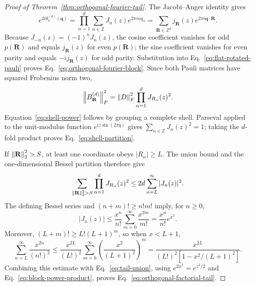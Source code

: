\begin{proof}[Proof of Theorem~\ref{thm:orthogonal-fourier-tail}]
The Jacobi--Anger identity gives
\begin{equation}
 e^{2i\theta_a^{(d)}(\mathbf q)}
 =\prod_{\alpha=1}^d
  \sum_{n\in\mathbb Z}J_n(z)e^{2\pi inq_\alpha}
 =\sum_{\mathbf R\in\mathbb Z^d}
  j_{\mathbf R}(z)e^{2\pi i\mathbf q\cdot\mathbf R}.
\end{equation}
Because $J_{-n}(z)=(-1)^nJ_n(z)$, the cosine coefficient vanishes for odd
$p(\mathbf R)$ and equals $j_{\mathbf R}(z)$ for even $p(\mathbf R)$; the sine
coefficient vanishes for even parity and equals $-ij_{\mathbf R}(z)$ for odd parity.
Substitution into Eq.~\eqref{eq:flat-rotated-pauli} proves
Eq.~\eqref{eq:orthogonal-fourier-block}. Since both Pauli matrices have squared
Frobenius norm two,
\begin{equation}
 \left\lVert B_{\mathbf R}^{(d)}\right\rVert_F^2
 =\left\lVert D\right\rVert_F^2\prod_{\alpha=1}^dJ_{R_\alpha}(z)^2.
 \label{eq:block-power-product}
\end{equation}
Equation~\eqref{eq:shell-power} follows by grouping a complete shell. Parseval applied
to the unit-modulus function $e^{iz\sin(2\pi q)}$ gives
$\sum_{n\in\mathbb Z}J_n(z)^2=1$; taking the $d$-fold product proves
Eq.~\eqref{eq:shell-partition}.

If $\left\lVert \mathbf R\right\rVert_2^2>S$, at least one coordinate obeys $|R_\alpha|\ge L$.
The union bound and the one-dimensional Bessel partition therefore give
\begin{equation}
 \sum_{\left\lVert \mathbf R\right\rVert_2^2>S}
 \prod_{\alpha=1}^dJ_{R_\alpha}(z)^2
 \le 2d\sum_{n=L}^{\infty}|J_n(z)|^2.
 \label{eq:tail-union}
\end{equation}
The defining Bessel series and $(n+m)!\ge n!m!$ imply, for $n\ge0$,
\begin{equation}
 |J_n(z)|
 \le \frac{x^n}{n!}\sum_{m=0}^{\infty}\frac{x^{2m}}{m!}
 =\frac{x^n}{n!}e^{x^2}.
\end{equation}
Moreover, $(L+m)!\ge L!(L+1)^m$, so when $x<L+1$,
\begin{equation}
 \sum_{n=L}^{\infty}\frac{x^{2n}}{(n!)^2}
 \le \frac{x^{2L}}{(L!)^2}
 \sum_{m=0}^{\infty}\left(\frac{x^2}{(L+1)^2}\right)^m
 =\frac{x^{2L}}
 {(L!)^2\left[1-x^2/(L+1)^2\right]}.
\end{equation}
Combining this estimate with Eq.~\eqref{eq:tail-union}, using
$e^{2x^2}=e^{z^2/2}$ and Eq.~\eqref{eq:block-power-product}, proves
Eq.~\eqref{eq:orthogonal-factorial-tail}.
\end{proof}

